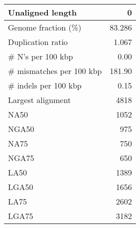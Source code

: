 \documentclass[12pt,a4paper]{article}
\begin{document}
\begin{table}[ht]
\begin{center}
\begin{tabular}{|l*{1}{|r}|}
Unaligned length & 0 \\ \hline
Genome fraction (\%) & 83.286 \\ \hline
Duplication ratio & 1.067 \\ \hline
\# N's per 100 kbp & 0.00 \\ \hline
\# mismatches per 100 kbp & 181.90 \\ \hline
\# indels per 100 kbp & 0.15 \\ \hline
Largest alignment & 4818 \\ \hline
NA50 & 1052 \\ \hline
NGA50 & 975 \\ \hline
NA75 & 750 \\ \hline
NGA75 & 650 \\ \hline
LA50 & 1389 \\ \hline
LGA50 & 1656 \\ \hline
LA75 & 2602 \\ \hline
LGA75 & 3182 \\ \hline
\end{tabular}
\end{center}
\end{table}
\end{document}

